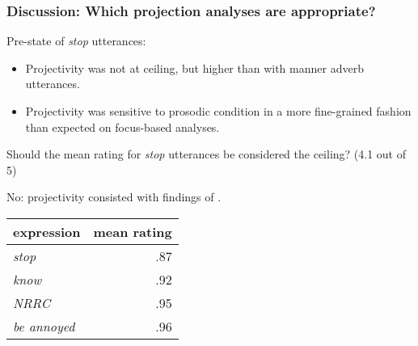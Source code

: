 \documentclass[pdf,xcolor=table,envcountsect,handout]{beamer}
\begin{document}
\begin{frame}
\frametitle{Discussion: Which projection analyses are appropriate?}

Pre-state of {\em stop} utterances: 

\begin{itemize}[topsep=-5pt]

\item Projectivity was not at ceiling, but higher than with manner adverb utterances.

\item Projectivity was sensitive to prosodic condition in a more fine-grained fashion than expected on focus-based analyses.

\end{itemize}

\bigskip

\pause
Should the mean rating for {\em stop} utterances be considered the ceiling? (4.1 out of 5)

No: projectivity consisted with findings of \citealt{tbd-variability}.

\hspace*{2cm} \begin{tabular}{lr}

expression & mean rating \\ \hline

{\em stop} & .87 \\

{\em know} & .92 \\

{\em NRRC} & .95 \\

{\em be annoyed} & .96 \\

\end{tabular}

\end{frame}
\end{document}
